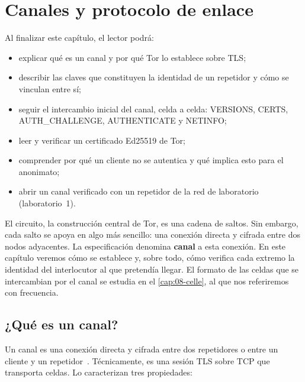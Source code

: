 \chapter{Canales y protocolo de enlace}\label{cap:07-canali}

\begin{obiettivi}
Al finalizar este capítulo, el lector podrá:
\begin{itemize}[nosep]
  \item explicar qué es un canal y por qué Tor lo establece sobre TLS;
  \item describir las claves que constituyen la identidad de un repetidor y cómo se vinculan entre sí;
  \item seguir el intercambio inicial del canal, celda a celda: VERSIONS, CERTS, AUTH\_CHALLENGE, AUTHENTICATE y NETINFO;
  \item leer y verificar un certificado Ed25519 de Tor;
  \item comprender por qué un cliente no se autentica y qué implica esto para el anonimato;
  \item abrir un canal verificado con un repetidor de la red de laboratorio (laboratorio~1).
\end{itemize}
\end{obiettivi}

El circuito, la construcción central de Tor, es una cadena de saltos. Sin embargo, cada salto se apoya en algo más sencillo: una conexión directa y cifrada entre dos nodos adyacentes. La especificación denomina \textbf{canal} a esta conexión. En este capítulo veremos cómo se establece y, sobre todo, cómo verifica cada extremo la identidad del interlocutor al que pretendía llegar. El formato de las celdas que se intercambian por el canal se estudia en el \cref{cap:08-celle}, al que nos referiremos con frecuencia.

\section{¿Qué es un canal?}\label{sec:canale-def}

Un canal es una conexión directa y cifrada entre dos repetidores o entre un cliente y un repetidor~. Técnicamente, es una sesión TLS sobre TCP que transporta celdas. Lo caracterizan tres propiedades:

